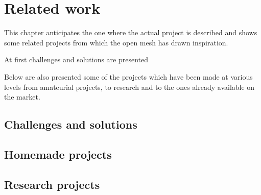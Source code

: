 

\chapter{Related work}\label{chapter:related_work}

	This chapter anticipates the one where the actual project is described and shows some related projects from which the open mesh has drawn inspiration.
	
	
	At first challenges and solutions are presented
	
	Below are also presented some of the projects which have been made at various levels from amateurial projects, to research and to the ones already available on the market.
	
	\section{Challenges and solutions}
	
	
		
	
	\section{Homemade projects}
	
		
	
	\section{Research projects}
	
